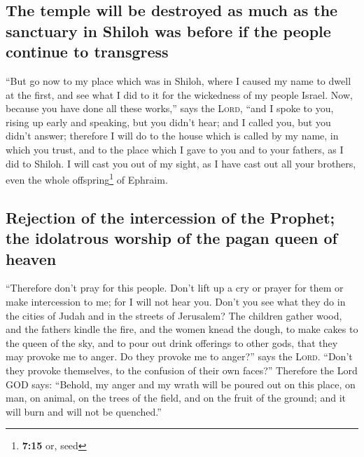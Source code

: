 \hypertarget{the-temple-will-be-destroyed-as-much-as-the-sanctuary-in-shiloh-was-before-if-the-people-continue-to-transgress}{%
\subsection{The temple will be destroyed as much as the sanctuary in
Shiloh was before if the people continue to
transgress}\label{the-temple-will-be-destroyed-as-much-as-the-sanctuary-in-shiloh-was-before-if-the-people-continue-to-transgress}}

 ``But go now to my place which was in Shiloh, where I
caused my name to dwell at the first, and see what I did to it for the
wickedness of my people Israel.  Now, because you have
done all these works,'' says the \textsc{Lord}, ``and I spoke to you,
rising up early and speaking, but you didn't hear; and I called you, but
you didn't answer;  therefore I will do to the house
which is called by my name, in which you trust, and to the place which I
gave to you and to your fathers, as I did to Shiloh.  I
will cast you out of my sight, as I have cast out all your brothers,
even the whole offspring\footnote{\textbf{7:15} or, seed} of Ephraim.

\hypertarget{rejection-of-the-intercession-of-the-prophet-the-idolatrous-worship-of-the-pagan-queen-of-heaven}{%
\subsection{Rejection of the intercession of the Prophet; the idolatrous
worship of the pagan queen of
heaven}\label{rejection-of-the-intercession-of-the-prophet-the-idolatrous-worship-of-the-pagan-queen-of-heaven}}

 ``Therefore don't pray for this people. Don't lift up a
cry or prayer for them or make intercession to me; for I will not hear
you.  Don't you see what they do in the cities of Judah
and in the streets of Jerusalem?  The children gather
wood, and the fathers kindle the fire, and the women knead the dough, to
make cakes to the queen of the sky, and to pour out drink offerings to
other gods, that they may provoke me to anger.  Do they
provoke me to anger?'' says the \textsc{Lord}. ``Don't they provoke
themselves, to the confusion of their own faces?'' 
Therefore the Lord GOD says: ``Behold, my anger and my wrath will be
poured out on this place, on man, on animal, on the trees of the field,
and on the fruit of the ground; and it will burn and will not be
quenched.''


